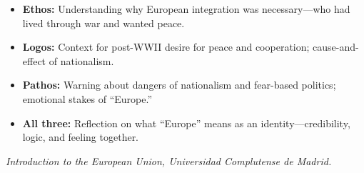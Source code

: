 \documentclass[11pt,a4paper]{article}
\begin{document}
\begin{itemize}
\item \textbf{Ethos:} Understanding why European integration was necessary---who had lived through war and wanted peace.
\item \textbf{Logos:} Context for post-WWII desire for peace and cooperation; cause-and-effect of nationalism.
\item \textbf{Pathos:} Warning about dangers of nationalism and fear-based politics; emotional stakes of ``Europe.''
\item \textbf{All three:} Reflection on what ``Europe'' means as an identity---credibility, logic, and feeling together.
\end{itemize}

\vspace{1em}
\noindent\footnotesize\textit{Introduction to the European Union, Universidad Complutense de Madrid.}
\end{document}
